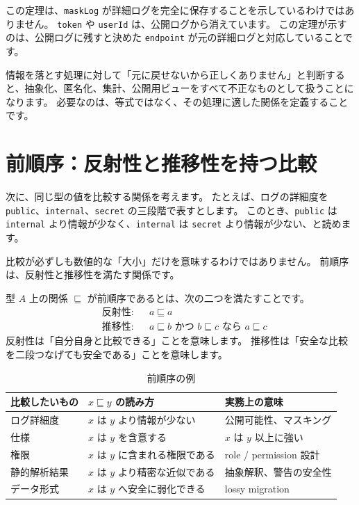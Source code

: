 この定理は、\texttt{maskLog} が詳細ログを完全に保存することを示しているわけではありません。
\texttt{token} や \texttt{userId} は、公開ログから消えています。
この定理が示すのは、公開ログに残すと決めた \texttt{endpoint} が元の詳細ログと対応していることです。

情報を落とす処理に対して「元に戻せないから正しくありません」と判断すると、抽象化、匿名化、集計、公開用ビューをすべて不正なものとして扱うことになります。
必要なのは、等式ではなく、その処理に適した関係を定義することです。

\section{前順序：反射性と推移性を持つ比較}

次に、同じ型の値を比較する関係を考えます。
たとえば、ログの詳細度を \texttt{public}、\texttt{internal}、\texttt{secret} の三段階で表すとします。
このとき、\texttt{public} は \texttt{internal} より情報が少なく、\texttt{internal} は \texttt{secret} より情報が少ない、と読めます。

比較が必ずしも数値的な「大小」だけを意味するわけではありません。
前順序は、反射性と推移性を満たす関係です。

型 \(A\) 上の関係 \(\sqsubseteq\) が前順序であるとは、次の二つを満たすことです。
\[
\begin{aligned}
&\text{反射性:} && a \sqsubseteq a \\
&\text{推移性:} && a \sqsubseteq b \text{ かつ } b \sqsubseteq c \text{ なら } a \sqsubseteq c
\end{aligned}
\]
反射性は「自分自身と比較できる」ことを意味します。
推移性は「安全な比較を二段つなげても安全である」ことを意味します。

\begin{table}[htbp]
\centering
\caption{前順序の例}
\label{tab:ch22-preorder-examples}
\begin{tabular}{lll}
\toprule
比較したいもの & \(x \sqsubseteq y\) の読み方 & 実務上の意味 \\
\midrule
ログ詳細度 & \(x\) は \(y\) より情報が少ない & 公開可能性、マスキング \\
仕様 & \(x\) は \(y\) を含意する & \(x\) は \(y\) 以上に強い \\
権限 & \(x\) は \(y\) に含まれる権限である & role / permission 設計 \\
静的解析結果 & \(x\) は \(y\) より精密な近似である & 抽象解釈、警告の安全性 \\
データ形式 & \(x\) は \(y\) へ安全に弱化できる & lossy migration \\
\bottomrule
\end{tabular}
\end{table}

